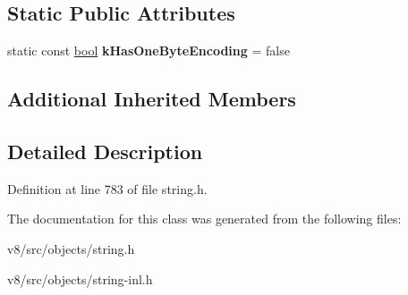\subsection*{Static Public Attributes}
\begin{DoxyCompactItemize}
\item 
\mbox{\label{classv8_1_1internal_1_1ExternalTwoByteString_a779cfe09d1f3870f54295c173b4f9385}} 
static const \mbox{\hyperlink{classbool}{bool}} {\bfseries k\+Has\+One\+Byte\+Encoding} = false
\end{DoxyCompactItemize}
\subsection*{Additional Inherited Members}


\subsection{Detailed Description}


Definition at line 783 of file string.\+h.



The documentation for this class was generated from the following files\+:\begin{DoxyCompactItemize}
\item 
v8/src/objects/string.\+h\item 
v8/src/objects/string-\/inl.\+h\end{DoxyCompactItemize}
